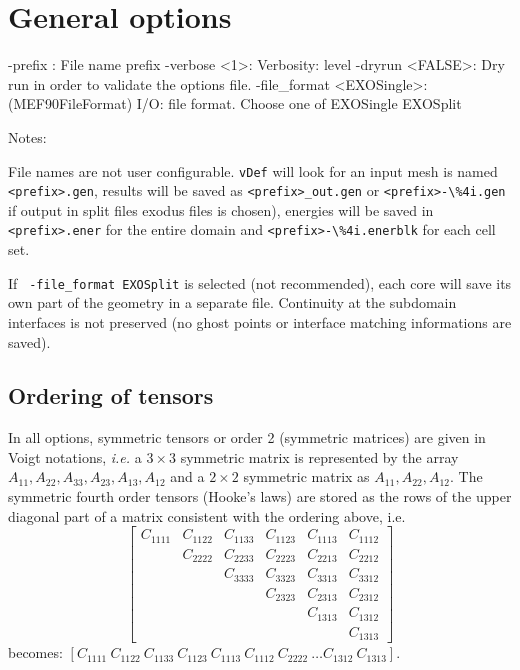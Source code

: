 \documentclass[10pt,oneside]{memoir}
\def\vDef{{\texttt{vDef}} }
\begin{document}
\section{General options}
\begin{boxedverbatim}
-prefix : File name prefix
-verbose <1>: Verbosity: level 
-dryrun <FALSE>: Dry run in order to validate the options file. 
-file_format <EXOSingle>: (MEF90FileFormat) I/O: file format. 
                          Choose one of EXOSingle EXOSplit
\end{boxedverbatim}
Notes: 
\begin{compactenum}
\item File names are not user configurable. \vDef will look for an input mesh is named \verb+<prefix>.gen+, results will be saved as \verb+<prefix>_out.gen+ or \verb+<prefix>-\%4i.gen+ if output in split files exodus files is chosen), energies will be saved in  \verb+<prefix>.ener+ for the entire domain and \verb+<prefix>-\%4i.enerblk+ for each cell set.
\item If \verb+ -file_format EXOSplit+ is selected (not recommended), each core will save its own part of the geometry in a separate file. Continuity at the subdomain interfaces is not preserved (no ghost points or interface matching informations are saved).
\end{compactenum}

\subsection{Ordering of tensors}
In all options, symmetric tensors or order 2 (symmetric matrices) are given in Voigt notations, \emph{i.e.} a $3\times 3$ symmetric matrix is represented by the array $A_{11},A_{22},A_{33},A_{23},A_{13},A_{12}$ and a $2\times 2$ symmetric matrix as $A_{11},A_{22},A_{12}$. 
The symmetric fourth order tensors (Hooke's laws) are stored as the rows of the upper diagonal part of a matrix consistent with the ordering above, i.e.
\begin{equation*}
	\begin{bmatrix}
		C_{1111} & C_{1122} & C_{1133} & C_{1123} & C_{1113} & C_{1112}\\
				 & C_{2222} & C_{2233} & C_{2223} & C_{2213} & C_{2212}\\
				 &          & C_{3333} & C_{3323} & C_{3313} & C_{3312}\\
				 &          &          & C_{2323} & C_{2313} & C_{2312}\\
				 &          &          &          & C_{1313} & C_{1312}\\
				 &          &          &          &          & C_{1313}
	\end{bmatrix}
\end{equation*}
becomes:
$\left[C_{1111}\ C_{1122}\  C_{1133}\  C_{1123}\  C_{1113}\  C_{1112}\  C_{2222}\  \dots  C_{1312}\  C_{1313}\right]$.
\end{document}
